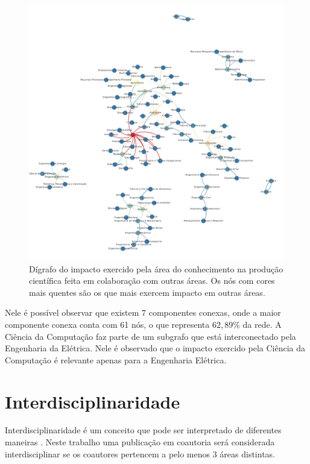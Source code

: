 \begin{figure}[htpb]
  \centering
  \includegraphics[width=1\textwidth]{figuras/resultados-grafo-impacto}
  \caption{Dígrafo do impacto exercido pela área do conhecimento na produção científica feita em colaboração com outras áreas. Os nós com cores mais quentes são os que mais exercem impacto em outras áreas.}
  \label{fig:grafoimpacto}
\end{figure}

Nele é possível observar que existem $7$ componentes conexas, onde a maior componente conexa conta com 61 nós, o que representa $62,89$\% da rede. A Ciência da Computação faz parte de um subgrafo que está interconectado pela Engenharia da Elétrica. Nele é observado que o impacto exercido pela Ciência da Computação é relevante apenas para a Engenharia Elétrica.

\section{Interdisciplinaridade}

Interdisciplinaridade é um conceito que pode ser interpretado de diferentes maneiras \cite{rousseau2019knowledge}. Neste trabalho uma publicação em coautoria será considerada interdisciplinar se os coautores pertencem a pelo menos 3 áreas distintas.

